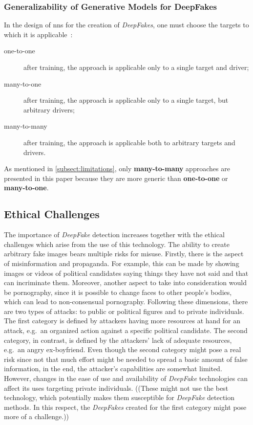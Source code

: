 \subsubsection{Generalizability of Generative Models for DeepFakes}\label{subsubsect:generalizability-deepfakes}
In the design of \glspl{nn} for the creation of \textit{DeepFakes}, one must choose the
targets to which it is applicable~\cite[cf.][]{Mirsky.2020}:
\begin{description}
    \item[one-to-one] after training, the approach is applicable only to a
    single target and driver;
    \item[many-to-one] after training, the approach is applicable only to a
    single target, but arbitrary drivers;
    \item[many-to-many] after training, the approach is applicable both to
    arbitrary targets and drivers.
\end{description}
As mentioned in \cref{subsect:limitations}, only \textbf{many-to-many} approaches
are presented in this paper because they are more generic than \textbf{one-to-one} or
\textbf{many-to-one}.

\subsection{Ethical Challenges}
The importance of \textit{DeepFake} detection increases together with the ethical
challenges which arise from the use of this technology. The ability to create
arbitrary fake images bears multiple risks for misuse. Firstly, there is the
aspect of misinformation and propaganda. For example, this can be made by showing images or videos
of political candidates saying things they have not said and that can incriminate
them. Moreover, another aspect to take into consideration would be pornography,
since it is possible to change faces to other people's bodies, which can lead to
non-consensual pornography. Following these dimensions, there are two types of attacks: to public or political figures and to private individuals. The first category
is defined by attackers having more resources at hand for an attack, e.g.\ an
organized action against a specific political candidate. The second category, in 
contrast, is defined by the attackers' lack of adequate resources, e.g.\ an angry 
ex-boyfriend. Even though the second category might pose a real risk since not 
that much effort might be needed to spread a basic amount of false information, in the 
end, the attacker's capabilities are somewhat limited. However, changes in the ease of use and 
availability of \textit{DeepFake} technologies can affect its uses targeting private individuals. ((These might not use the best technology, which potentially makes them 
susceptible for \textit{DeepFake} detection methods. In this respect, the \textit{DeepFakes}
created for the first category might pose more of a challenge.))
 